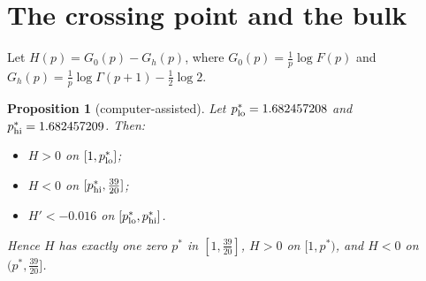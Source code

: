 \documentclass[11pt]{article}
\newtheorem{proposition}[theorem]{Proposition}
\theoremstyle{remark}
\begin{document}
\section{The crossing point and the bulk}\label{sec:bulk}
Let $H(p)=G_0(p)-G_h(p)$, where $G_0(p)=\frac1p\log F(p)$ and $G_h(p)=\frac1p\log\Gamma(p+1)-\frac12\log2$.

\begin{proposition}[computer-assisted]\label{prop:crossing}
Let $p^*_{\rm lo}=1.682457208$ and $p^*_{\rm hi}=1.682457209$. Then:
\begin{itemize}
\item $H>0$ on $[1,p^*_{\rm lo}]$;
\item $H<0$ on $[p^*_{\rm hi},\frac{39}{20}]$;
\item $H'<-0.016$ on $[p^*_{\rm lo},p^*_{\rm hi}]$.
\end{itemize}
Hence $H$ has exactly one zero $p^*$ in $[1,\frac{39}{20}]$, $H>0$ on $[1,p^*)$, and $H<0$ on $(p^*,\frac{39}{20}]$.
\end{proposition}
\end{document}
